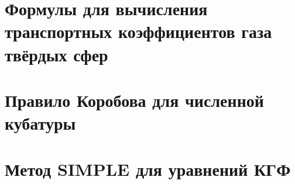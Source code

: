 
\chapter{Формулы для вычисления транспортных коэффициентов газа твёрдых сфер} \label{app:coefficients}

\chapter{Правило Коробова для численной кубатуры} \label{app:korobov}

\chapter{Метод SIMPLE для уравнений КГФ} \label{app:simple}
